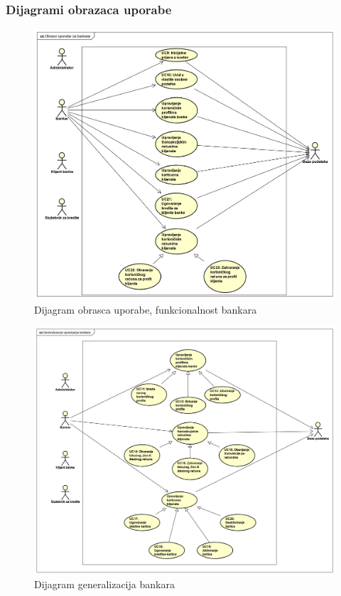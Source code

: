 	\eject
				
					
				\subsubsection{Dijagrami obrazaca uporabe}
					
				\begin{figure}[H]
					\includegraphics[scale=0.5]{slike/UseCase Diagram0Matija.PNG}
					\centering
					\caption{Dijagram obrasca uporabe, funkcionalnost bankara}
					\label{fig:ucd0Matija}
				\end{figure}
			
				\begin{figure}[H]
					\includegraphics[scale=0.4]{slike/UseCase Diagram1Matija.PNG}
					\centering
					\caption{Dijagram generalizacija bankara}
					\label{fig:ucd1Matija}
				\end{figure}
				\eject		
				
